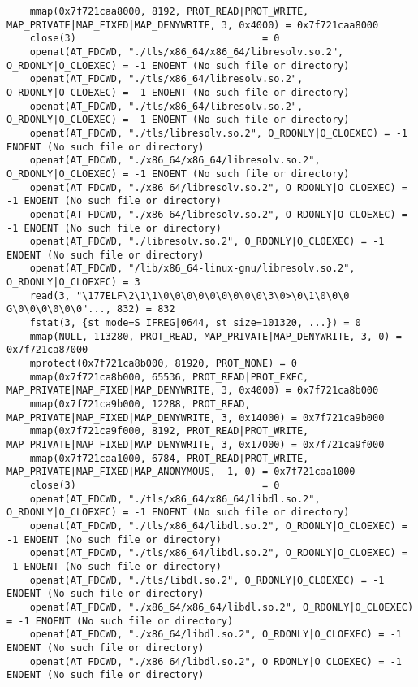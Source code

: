 \documentclass[pdf, unicode, 12pt, a4paper,oneside,fleqn]{article}
\begin{document}
{\begin{verbatim}
    mmap(0x7f721caa8000, 8192, PROT_READ|PROT_WRITE, MAP_PRIVATE|MAP_FIXED|MAP_DENYWRITE, 3, 0x4000) = 0x7f721caa8000
    close(3)                                = 0
    openat(AT_FDCWD, "./tls/x86_64/x86_64/libresolv.so.2", O_RDONLY|O_CLOEXEC) = -1 ENOENT (No such file or directory)
    openat(AT_FDCWD, "./tls/x86_64/libresolv.so.2", O_RDONLY|O_CLOEXEC) = -1 ENOENT (No such file or directory)
    openat(AT_FDCWD, "./tls/x86_64/libresolv.so.2", O_RDONLY|O_CLOEXEC) = -1 ENOENT (No such file or directory)
    openat(AT_FDCWD, "./tls/libresolv.so.2", O_RDONLY|O_CLOEXEC) = -1 ENOENT (No such file or directory)
    openat(AT_FDCWD, "./x86_64/x86_64/libresolv.so.2", O_RDONLY|O_CLOEXEC) = -1 ENOENT (No such file or directory)
    openat(AT_FDCWD, "./x86_64/libresolv.so.2", O_RDONLY|O_CLOEXEC) = -1 ENOENT (No such file or directory)
    openat(AT_FDCWD, "./x86_64/libresolv.so.2", O_RDONLY|O_CLOEXEC) = -1 ENOENT (No such file or directory)
    openat(AT_FDCWD, "./libresolv.so.2", O_RDONLY|O_CLOEXEC) = -1 ENOENT (No such file or directory)
    openat(AT_FDCWD, "/lib/x86_64-linux-gnu/libresolv.so.2", O_RDONLY|O_CLOEXEC) = 3
    read(3, "\177ELF\2\1\1\0\0\0\0\0\0\0\0\0\3\0>\0\1\0\0\0 G\0\0\0\0\0\0"..., 832) = 832
    fstat(3, {st_mode=S_IFREG|0644, st_size=101320, ...}) = 0
    mmap(NULL, 113280, PROT_READ, MAP_PRIVATE|MAP_DENYWRITE, 3, 0) = 0x7f721ca87000
    mprotect(0x7f721ca8b000, 81920, PROT_NONE) = 0
    mmap(0x7f721ca8b000, 65536, PROT_READ|PROT_EXEC, MAP_PRIVATE|MAP_FIXED|MAP_DENYWRITE, 3, 0x4000) = 0x7f721ca8b000
    mmap(0x7f721ca9b000, 12288, PROT_READ, MAP_PRIVATE|MAP_FIXED|MAP_DENYWRITE, 3, 0x14000) = 0x7f721ca9b000
    mmap(0x7f721ca9f000, 8192, PROT_READ|PROT_WRITE, MAP_PRIVATE|MAP_FIXED|MAP_DENYWRITE, 3, 0x17000) = 0x7f721ca9f000
    mmap(0x7f721caa1000, 6784, PROT_READ|PROT_WRITE, MAP_PRIVATE|MAP_FIXED|MAP_ANONYMOUS, -1, 0) = 0x7f721caa1000
    close(3)                                = 0
    openat(AT_FDCWD, "./tls/x86_64/x86_64/libdl.so.2", O_RDONLY|O_CLOEXEC) = -1 ENOENT (No such file or directory)
    openat(AT_FDCWD, "./tls/x86_64/libdl.so.2", O_RDONLY|O_CLOEXEC) = -1 ENOENT (No such file or directory)
    openat(AT_FDCWD, "./tls/x86_64/libdl.so.2", O_RDONLY|O_CLOEXEC) = -1 ENOENT (No such file or directory)
    openat(AT_FDCWD, "./tls/libdl.so.2", O_RDONLY|O_CLOEXEC) = -1 ENOENT (No such file or directory)
    openat(AT_FDCWD, "./x86_64/x86_64/libdl.so.2", O_RDONLY|O_CLOEXEC) = -1 ENOENT (No such file or directory)
    openat(AT_FDCWD, "./x86_64/libdl.so.2", O_RDONLY|O_CLOEXEC) = -1 ENOENT (No such file or directory)
    openat(AT_FDCWD, "./x86_64/libdl.so.2", O_RDONLY|O_CLOEXEC) = -1 ENOENT (No such file or directory)

\end{verbatim}}
\end{document}
